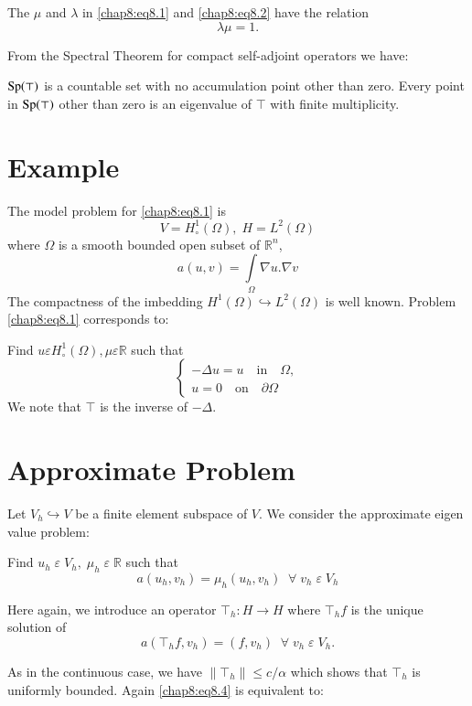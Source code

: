 The $\mu$ and $\lambda$ in \eqref{chap8:eq8.1} and \eqref{chap8:eq8.2}
have the relation 
$$
\lambda\mu=1.
$$

From the Spectral Theorem for compact self-adjoint operators we have:

$\operatorname{Sp}(\top)$ is a countable set with no accumulation point other than
zero. Every point in $\operatorname{Sp}(\top)$ other than zero is an eigenvalue of
$\top$ with finite multiplicity. 

\section{Example}\label{chap8:sec3} 
The model problem for \eqref{chap8:eq8.1} is 
$$
V=H_\circ^1(\Omega), \;H=L^2(\Omega)
$$
where $\Omega$ is a smooth bounded open subset of $\mathbb{R}^n$,
$$
a(u,v)=\int\limits_\Omega \nabla u.\nabla v
$$
The compactness of the imbedding $H^1(\Omega)\hookrightarrow
L^2(\Omega)$ is well known. Problem \eqref{chap8:eq8.1} corresponds
to:

Find $u\varepsilon H_\circ^1(\Omega), \mu\varepsilon\mathbb{R}$ such
that 
\begin{equation}\label{chap8:eq8.3}
\begin{cases}
-\Delta u=u\quad\text{in}\quad\Omega,\\
u=0\quad\text{on}\quad\partial\Omega
\end{cases}
\end{equation}\pageoriginale
We note that $\top$ is the inverse of $-\Delta$.

\section{Approximate Problem}\label{chap8:sec4} Let
$V_h\hookrightarrow V$ be a finite element subspace of $V$. We
consider the approximate eigen value problem:

Find $u_h\;\varepsilon \;V_h,\;\mu_h\;\varepsilon \;\mathbb{R}$ such
that 
\begin{equation}\label{chap8:eq8.4}
a(u_h,v_h)=\mu_h(u_h,v_h)\; \; \forall \;v_h\;\varepsilon \;V_h 
\end{equation}

Here again, we introduce an operator $\top_h:H\to H$ where $\top_hf$
is the unique solution of 
\begin{equation}\label{chap8:eq8.5}
a(\top_hf,v_h)=(f,v_h)\; \; \forall \;v_h\;\varepsilon \;V_h.
\end{equation}

As in the continuous case, we have $\parallel\top_h\parallel\leq
c/\alpha$ which shows that $\top_h$ is uniformly bounded. Again
\eqref{chap8:eq8.4} is equivalent to:

